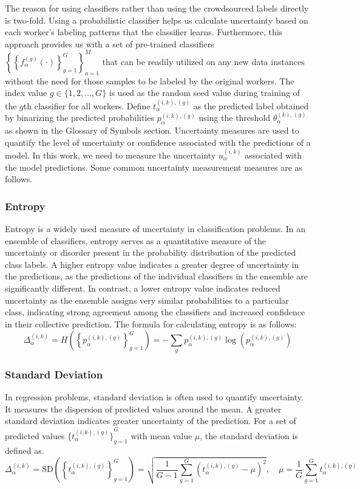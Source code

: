 The reason for using classifiers rather than using the crowdsourced labels directly is two-fold. Using a probabilistic classifier helps us calculate uncertainty based on each worker's labeling patterns that the classifier learns. Furthermore, this approach provides us with a set of pre-trained classifiers ${\left\{ {\left\{f_{\alpha}^{(g)}(\cdot) \right\}}_{g=1}^G  \right\}}_{a=1}^{M} $ that can be readily utilized on any new data instances without the need for those samples to be labeled by the original workers.
The index value $g  \in \{1,2,\dots,G\} $ is used as the random seed value during training of the $g$\-th classifier for all workers.
Define $t_{\alpha}^{(i,k),(g)} $ as the predicted label obtained by binarizing the predicted probabilities $p_{\alpha}^{ (i,k),(g)} $ using the threshold $\theta_{\alpha}^{(k),(g)} $ as shown in the Glossary of Symbols section.
Uncertainty measures are used to quantify the level of uncertainty or confidence associated with the predictions of a model. In this work, we need to measure the uncertainty $u_{\alpha}^{(i,k)}$ associated with the model predictions. Some common uncertainty measurement measures are as follows.
%
\subsubsection{Entropy}
Entropy is a widely used measure of uncertainty in classification problems. In an ensemble of classifiers, entropy serves as a quantitative measure of the uncertainty or disorder present in the probability distribution of the predicted class labels. A higher entropy value indicates a greater degree of uncertainty in the predictions, as the predictions of the individual classifiers in the ensemble are significantly different. In contrast, a lower entropy value indicates reduced uncertainty as the ensemble assigns very similar probabilities to a particular class, indicating strong agreement among the classifiers and increased confidence in their collective prediction. The formula for calculating entropy is as follows:
\begin{equation}
\Delta_{\alpha}^{(i,k)} = H\left({\left\{p_{\alpha}^{(i,k),(g)}\right\}}_{g=1}^{G}\right)=-\sum_{g}{p_{\alpha}^{(i,k),(g)} \log\left(p_{\alpha}^{(i,k),(g)}\right)}
\label{eq:crowd.Eq.5.uncertainty}
\end{equation}

\subsubsection{Standard Deviation}
In regression problems, standard deviation is often used to quantify uncertainty. It measures the dispersion of predicted values around the mean. A greater standard deviation indicates greater uncertainty of the prediction. For a set of predicted values ${\{t_{\alpha}^{(i,k),(g)} \}}_{g=1}^G $ with mean value $\mu $, the standard deviation is defined as.
\begin{equation}
\Delta_{\alpha}^{(i,k)}=\text{SD}\left({\left\{t_{\alpha}^{(i,k),(g)}\right\}}_{g=1}^G\right)=\sqrt {\frac{1}{G-1}\sum_{g=1}^G {\left(t_{\alpha}^{(i,k),(g)}-\mu\right)}^2} , \quad\mu=\frac{1}{G}\sum_{g=1}^{G}{t_{\alpha}^{(i,k),(g)}}
\label{eq:crowd.Eq.6.uncertainty.sd}
\end{equation}
%

